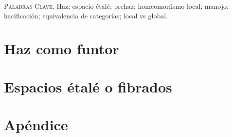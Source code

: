 \documentclass[letterpaper]{article} %
\date{}
\renewenvironment{abstract}
{\small
   \list{}{%
      \setlength{\leftmargin}{1.4cm}%
      \setlength{\rightmargin}{\leftmargin}%
   }%
   \item\relax}
{\endlist}
\begin{document}
   
   \vspace{1cm}

   \begin{abstract}
      
        
      \vspace{0.3cm}
      \textsc{Palabras Clave.} Haz; espacio étalé; prehaz; homeomorfismo local; manojo; hacificación; equivalencia de categorías; local vs global.
   \end{abstract}

   \vspace{1cm}

   \tableofcontents

   \section{Haz como funtor}
      
   \section{Espacios étalé o fibrados}
      
   \section{Apéndice}\label{section:Apendice}
      
  
   \newpage
   \nocite{*}
   
   
\end{document}
